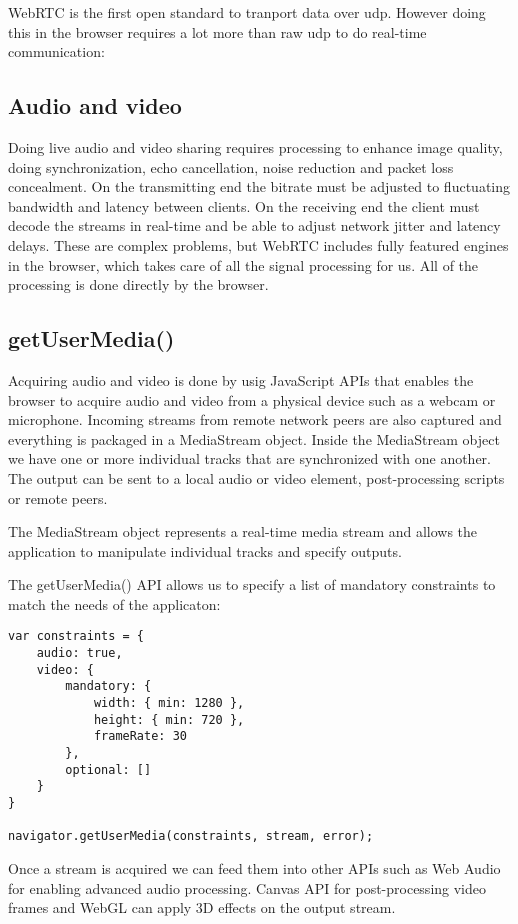WebRTC is the first open standard to tranport data over \gls{udp}. However doing this in the browser requires a lot more than raw \gls{udp} to do real-time communication:

\subsection{Audio and video}
Doing live audio and video sharing requires processing to enhance image quality, doing synchronization, echo cancellation, noise reduction and packet loss concealment\cite{Grigorik2013High}. On the transmitting end the bitrate must be adjusted to fluctuating bandwidth and latency between clients. On the receiving end the client must decode the streams in real-time and be able to adjust network jitter and latency delays. These are complex problems, but WebRTC includes fully featured engines in the browser, which takes care of all the signal processing for us. All of the processing is done directly by the browser.

\subsection{getUserMedia()}
Acquiring audio and video is done by usig JavaScript APIs that enables the browser to acquire audio and video from a physical device such as a webcam or microphone. Incoming streams from remote network peers are also captured and everything is packaged in a MediaStream object. Inside the MediaStream object we have one or more individual tracks that are synchronized with one another. The output can be sent to a local audio or video element, post-processing scripts or remote peers.

The MediaStream object represents a real-time media stream and allows the application to manipulate individual tracks and specify outputs.


The getUserMedia() API allows us to specify a list of mandatory constraints to match the needs of the applicaton:

\lstset{language=Javascript} 
\begin{lstlisting}
var constraints = {
	audio: true,
	video: {
		mandatory: {
			width: { min: 1280 },
			height: { min: 720 },
			frameRate: 30
		},
		optional: []
	}
}

navigator.getUserMedia(constraints, stream, error);
\end{lstlisting}

Once a stream is acquired we can feed them into other APIs such as Web Audio for enabling advanced audio processing. Canvas API for post-processing video frames and WebGL can apply 3D effects on the output stream.

